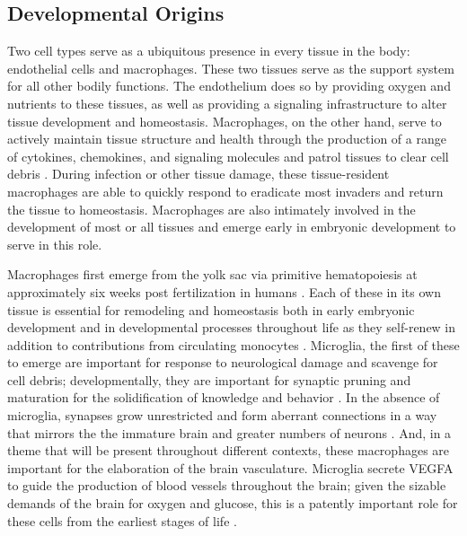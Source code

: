 \subsection{Developmental Origins}\label{macdev}

Two cell types serve as a ubiquitous presence in every tissue in the body: endothelial cells and macrophages. These two tissues serve as the support system for all other bodily functions. The endothelium does so by providing oxygen and nutrients to these tissues, as well as providing a signaling infrastructure to alter tissue development and homeostasis. Macrophages, on the other hand, serve to actively maintain tissue structure and health through the production of a range of cytokines, chemokines, and signaling molecules and patrol tissues to clear cell debris \citep{Wynn2013}. During infection or other tissue damage, these tissue\hyp{}resident macrophages are able to quickly respond to eradicate most invaders and return the tissue to homeostasis. Macrophages are also intimately involved in the development of most or all tissues and emerge early in embryonic development to serve in this role.

Macrophages first emerge from the yolk sac via primitive hematopoiesis at approximately six weeks post fertilization in humans \citep{Geissmann2010, Yona2013, Feyaerts2022}. Each of these in its own tissue is essential for remodeling and homeostasis both in early embryonic development and in developmental processes throughout life as they self-renew in addition to contributions from circulating monocytes \citep{Jappinen2019}. Microglia, the first of these to emerge are important for response to neurological damage and scavenge for cell debris; developmentally, they are important for synaptic pruning and maturation for the solidification of knowledge and behavior \citep{Wynn2013, Lavin2015}. In the absence of microglia, synapses grow unrestricted and form aberrant connections in a way that mirrors the the immature brain and greater numbers of neurons \citep{Hammond2018}. And, in a theme that will be present throughout different contexts, these macrophages are important for the elaboration of the brain vasculature. Microglia secrete VEGFA to guide the production of blood vessels throughout the brain; given the sizable demands of the brain for oxygen and glucose, this is a patently important role for these cells from the earliest stages of life \citep{Dudiki2020}. 

